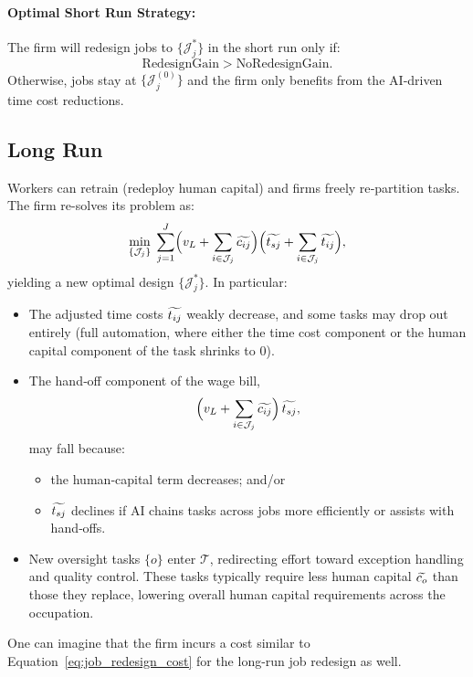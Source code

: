 \documentclass{article}
\theoremstyle{plain}
\theoremstyle{plain}
\begin{document}
\paragraph{Optimal Short Run Strategy:}
The firm will redesign jobs to \(\{\mathcal{J}_j^*\}\) in the short run only if:
\[
\text{RedesignGain} > \text{NoRedesignGain}.
\]
Otherwise, jobs stay at \(\{\mathcal{J}_j^{(0)}\}\) and the firm only benefits from the AI‐driven time cost reductions.



\subsection{Long Run}  

Workers can retrain (redeploy human capital) and firms freely re‐partition tasks.  
The firm re-solves its problem as:
\[
\min_{\{\mathcal{J}_j\}}\;
\sum_{j=1}^J 
\Bigl(v_L + \sum_{i\in\mathcal{J}_j}\widetilde{c_{ij}}\Bigr)
\Bigl(\widetilde{t_{sj}} + \sum_{i\in\mathcal{J}_j}\widetilde{t_{ij}}\Bigr),
\]
yielding a new optimal design \(\{\mathcal{J}_j^*\}\).  
In particular:
\begin{itemize}
  \item The adjusted time costs \(\widetilde{t_{ij}}\) weakly decrease, and some tasks may drop out entirely (full automation, where either the time cost component or the human capital component of the task shrinks to 0).
  \item The hand‐off component of the wage bill,
  \[
    \Bigl(v_L + \sum_{i\in\mathcal{J}_j}\widetilde{c_{ij}}\Bigr)\,\widetilde{t_{sj}},
  \]
  may fall because:
  \begin{itemize}
    \item the human‐capital term decreases; and/or
    \item \(\widetilde{t_{sj}}\) declines if AI chains tasks across jobs more efficiently or assists with hand‐offs.
  \end{itemize}
  \item New oversight tasks \(\{o\}\) enter \(\mathcal{T}\), redirecting effort toward exception handling and quality control. These tasks typically require less human capital \(\widetilde{c_{o}}\) than those they replace, lowering overall human capital requirements across the occupation.
\end{itemize}
One can imagine that the firm incurs a cost similar to Equation~\ref{eq:job_redesign_cost} for the long-run job redesign as well.
\end{document}
